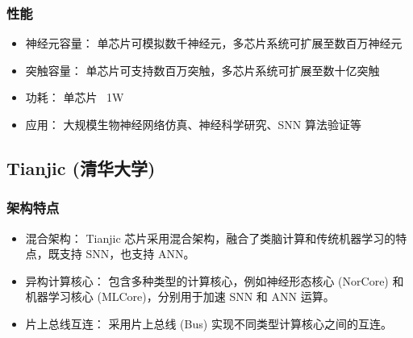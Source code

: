 \documentclass[12pt, a4paper, oneside]{ctexart}
\numberwithin{equation}{section}  %
\begin{document}
\subsubsection{性能}
\begin{itemize}
    \item 神经元容量： 单芯片可模拟数千神经元，多芯片系统可扩展至数百万神经元
    \item 突触容量： 单芯片可支持数百万突触，多芯片系统可扩展至数十亿突触
    \item 功耗： 单芯片 ~1W
    \item 应用： 大规模生物神经网络仿真、神经科学研究、SNN 算法验证等
\end{itemize}
\subsection{Tianjic (清华大学)}
\subsubsection{架构特点}
\begin{itemize}
    \item 混合架构： Tianjic 芯片采用混合架构，融合了类脑计算和传统机器学习的特点，既支持 SNN，也支持 ANN。
    \item 异构计算核心： 包含多种类型的计算核心，例如神经形态核心 (NorCore) 和机器学习核心 (MLCore)，分别用于加速 SNN 和 ANN 运算。
    \item 片上总线互连： 采用片上总线 (Bus) 实现不同类型计算核心之间的互连。
\end{itemize}
\end{document}
